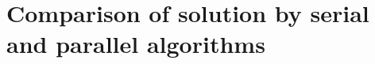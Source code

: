 \section{Comparison of solution by serial and parallel algorithms} \label{s:results:compare-solutions-serial-parallel}